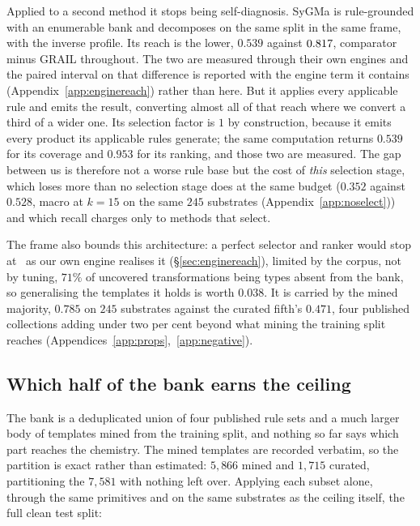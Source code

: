Applied to a second method it stops being self-diagnosis. SyGMa is rule-grounded with an enumerable
bank and decomposes on the same split in the same frame, with the inverse profile. Its reach is the
lower, $0.539$ against $0.817$, comparator minus GRAIL throughout. The two are measured through
their own engines and the paired interval on that difference is reported with the engine term it
contains (Appendix~\ref{app:enginereach}) rather than here. But it applies every applicable rule and emits the result, converting almost all of that
reach where we convert a third of a wider one. Its selection factor is $1$ by construction, because it
emits every product its applicable rules generate; the same computation returns $0.539$ for its
coverage and $0.953$ for its ranking, and those two are measured. The gap between us is therefore
not a worse rule base but the cost of \emph{this} selection stage, which loses more than no
selection stage does at the same budget ($0.352$ against $0.528$, macro at $k=15$ on the same
$245$ substrates (Appendix~\ref{app:noselect})) and which recall charges only to methods that
select.

The frame also bounds this architecture: a perfect selector and ranker would stop at \ceiling\ as
our own engine realises it (\S\ref{sec:enginereach}), limited by the corpus, not by tuning,
$71\%$ of uncovered transformations being types absent from the bank, so generalising the templates
it holds is worth $0.038$. It is carried by the mined majority, $0.785$ on $245$ substrates against
the curated fifth's $0.471$, four published collections adding under two per cent beyond what
mining the training split reaches (Appendices~\ref{app:props},~\ref{app:negative}).


\subsection{Which half of the bank earns the ceiling}
\label{app:provenance}

The bank is a deduplicated union of four published rule sets and a much larger body of templates
mined from the training split, and nothing so far says which part reaches the chemistry.
The mined templates are recorded verbatim, so the partition is exact rather than estimated: $5{,}866$ mined and $1{,}715$ curated, partitioning the $7{,}581$ with nothing left over.
Applying each subset alone, through the same primitives and on the same substrates as the ceiling
itself, the full clean test split:

